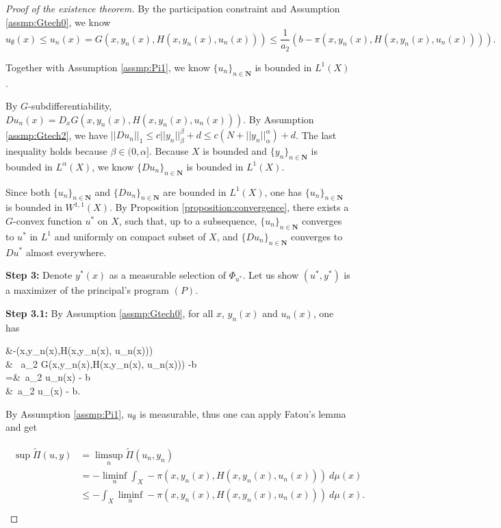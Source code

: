 \documentclass[a4paper, 11pt]{amsart}
\numberwithin{equation}{section}
\theoremstyle{plain}
\theoremstyle{definition}
\theoremstyle{remark}
\newcommand{\N}{\mathbf{N}}
\begin{document}
\begin{proof}[Proof of the existence theorem]
	By the participation constraint and Assumption \ref{assmp:Gtech0}, we know 
	\begin{equation*}
	u_{\emptyset}(x) \le u_n(x) = G(x,y_n(x),H(x,y_n(x),u_n(x))) \le \frac{1}{a_2}(b - \pi(x,y_n(x),H(x,y_n(x),u_n(x)))).
	\end{equation*}



Together with Assumption \ref{assmp:Pi1}, we know $\{u_n\}_{n\in \N}$ is bounded in $L^1(X)$.\medskip

	By $G$-subdifferentiability, $Du_n(x) = D_x G(x, y_n(x), H(x,y_n(x),u_n(x)))$. By Assumption \ref{assmp:Gtech2}, we have $||Du_n||_{1}\le c||y_n||_{\beta}^{\beta}+d \le c\left(N+||y_n||_{\alpha}^{\alpha}\right)+d$. The last inequality holds because $\beta \in (0, \alpha]$. Because $X$ is bounded and $\{y_n\}_{n\in \N}$ is bounded in $L^{\alpha}(X)$, we know $\{Du_n\}_{n\in \N}$ is bounded in $L^1(X)$.\medskip
	
	Since both $\{u_n\}_{n\in \N}$ and $\{Du_n\}_{n\in \N}$ are bounded in $L^1(X)$, one has $\{u_n\}_{n\in \N}$ is bounded in $W^{1,1}(X)$. By Proposition \ref{proposition:convergence}, there exists a $G$-convex function $u^*$ on $X$, such that, up to a subsequence, $\{u_n\}_{n\in \N}$ converges to $u^*$ in $L^1$ and uniformly on compact subset of $X$, and $\{D u_n\}_{n\in \N}$ converges to $D u^*$ almost everywhere.\medskip

{\bf Step 3: } Denote $y^*(x)$ as a measurable selection of $\Phi_{u^*}$. Let us show $(u^*,y^*)$ is a maximizer of the principal's program $(P)$. \medskip

	{\bf Step 3.1: }By Assumption \ref{assmp:Gtech0}, for all $x$, $y_n(x)$ and $u_n(x)$,
	one has
	\begin{flalign*}
	&-\pi(x,y_n(x),H(x,y_n(x), u_n(x)))\\
	\ge & \ a_2 G(x,y_n(x),H(x,y_n(x), u_n(x))) -b \\
	=&\  a_2 u_n(x) - b \\
	\ge&\ a_2 u_{\emptyset}(x) - b.
	\end{flalign*}


By Assumption \ref{assmp:Pi1}, $u_{\emptyset}$ is measurable, thus one can apply Fatou's lemma and get

	\begin{align}\label{3}
	\begin{split}
	\sup \tilde{\Pi}(u,y) & = \limsup\limits_{n} \tilde{\Pi}(u_n, y_n) \\
	&= -\liminf\limits_{n} \int_{X} - \pi(x, y_n(x), H(x,y_n(x),u_n(x)))  ~d\mu(x)\\
	& \le - \int_{X} \liminf\limits_{n} - \pi(x, y_n(x), H(x,y_n(x),u_n(x)))~ d\mu(x). \\
	\end{split}
	\end{align}
	

\end{proof}
\end{document}
